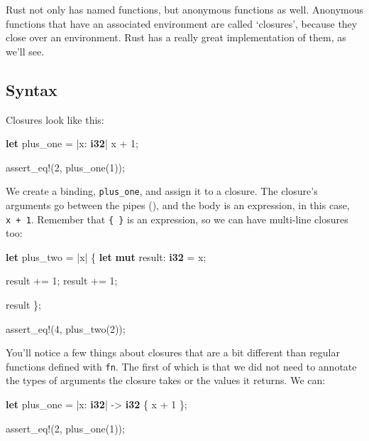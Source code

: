 \documentclass[a4paper,]{book}
\newenvironment{Shaded}{\begin{snugshade}}{\end{snugshade}}
\newcommand{\KeywordTok}[1]{\textcolor[rgb]{0.13,0.29,0.53}{\textbf{{#1}}}}
\newcommand{\DecValTok}[1]{\textcolor[rgb]{0.00,0.00,0.81}{{#1}}}
\newcommand{\OtherTok}[1]{\textcolor[rgb]{0.56,0.35,0.01}{{#1}}}
\newcommand{\NormalTok}[1]{{#1}}
\begin{document}
Rust not only has named functions, but anonymous functions as well.
Anonymous functions that have an associated environment are called
`closures', because they close over an environment. Rust has a really
great implementation of them, as we'll see.

\subsection{Syntax}\label{syntax}

Closures look like this:

\begin{Shaded}
\begin{Highlighting}[]
\KeywordTok{let} \NormalTok{plus_one = |x: }\KeywordTok{i32}\NormalTok{| x + }\DecValTok{1}\NormalTok{;}

\OtherTok{assert_eq!}\NormalTok{(}\DecValTok{2}\NormalTok{, plus_one(}\DecValTok{1}\NormalTok{));}
\end{Highlighting}
\end{Shaded}

We create a binding, \texttt{plus\_one}, and assign it to a closure. The
closure's arguments go between the pipes (\texttt{\textbar{}}), and the
body is an expression, in this case, \texttt{x\ +\ 1}. Remember that
\texttt{\{\ \}} is an expression, so we can have multi-line closures
too:

\begin{Shaded}
\begin{Highlighting}[]
\KeywordTok{let} \NormalTok{plus_two = |x| \{}
    \KeywordTok{let} \KeywordTok{mut} \NormalTok{result: }\KeywordTok{i32} \NormalTok{= x;}

    \NormalTok{result += }\DecValTok{1}\NormalTok{;}
    \NormalTok{result += }\DecValTok{1}\NormalTok{;}

    \NormalTok{result}
\NormalTok{\};}

\OtherTok{assert_eq!}\NormalTok{(}\DecValTok{4}\NormalTok{, plus_two(}\DecValTok{2}\NormalTok{));}
\end{Highlighting}
\end{Shaded}

You'll notice a few things about closures that are a bit different than
regular functions defined with \texttt{fn}. The first of which is that
we did not need to annotate the types of arguments the closure takes or
the values it returns. We can:

\begin{Shaded}
\begin{Highlighting}[]
\KeywordTok{let} \NormalTok{plus_one = |x: }\KeywordTok{i32}\NormalTok{| -> }\KeywordTok{i32} \NormalTok{\{ x + }\DecValTok{1} \NormalTok{\};}

\OtherTok{assert_eq!}\NormalTok{(}\DecValTok{2}\NormalTok{, plus_one(}\DecValTok{1}\NormalTok{));}
\end{Highlighting}
\end{Shaded}
\end{document}
